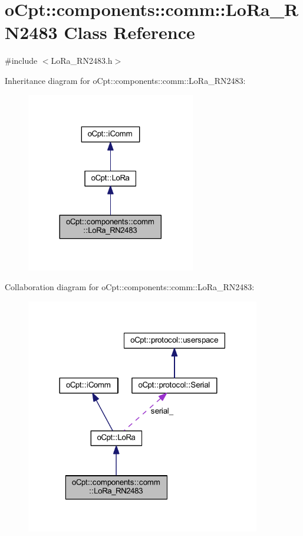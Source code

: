 \hypertarget{classo_cpt_1_1components_1_1comm_1_1_lo_ra___r_n2483}{}\section{o\+Cpt\+:\+:components\+:\+:comm\+:\+:Lo\+Ra\+\_\+\+R\+N2483 Class Reference}
\label{classo_cpt_1_1components_1_1comm_1_1_lo_ra___r_n2483}


{\ttfamily \#include $<$Lo\+Ra\+\_\+\+R\+N2483.\+h$>$}



Inheritance diagram for o\+Cpt\+:\+:components\+:\+:comm\+:\+:Lo\+Ra\+\_\+\+R\+N2483\+:
\nopagebreak
\begin{figure}[H]
\begin{center}
\leavevmode
\includegraphics[width=209pt]{classo_cpt_1_1components_1_1comm_1_1_lo_ra___r_n2483__inherit__graph}
\end{center}
\end{figure}


Collaboration diagram for o\+Cpt\+:\+:components\+:\+:comm\+:\+:Lo\+Ra\+\_\+\+R\+N2483\+:
\nopagebreak
\begin{figure}[H]
\begin{center}
\leavevmode
\includegraphics[width=290pt]{classo_cpt_1_1components_1_1comm_1_1_lo_ra___r_n2483__coll__graph}
\end{center}
\end{figure}
